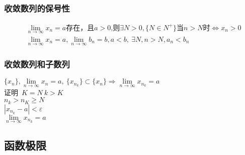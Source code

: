 \subsubsection{收敛数列的保号性}
\begin{align}
   &\mbox{$\lim\limits_{n \to\infty}x_n=a$存在，且$a>0$,则$\exists N>0,\{N\in N^+\}$当$n>N$时$\Leftrightarrow x_n>0$}\label{Serial_number_preservation_a}\\
    &\lim\limits_{n\to\infty}x_n=a,\lim\limits_{n\to\infty}b_n=b,a<b,\ \exists N,n>N,a_n<b_n \label{Serial_number_preservation_b}
\end{align}
\subsubsection{收敛数列和子数列
}
$\{x_n\},\lim\limits_{n\to\infty}x_n=a,\ \{x_{n_k}\}\subset\{x_n\}\Rightarrow \lim\limits_{n\to\infty}x_{n_k}=a$
\\证明\ $K=N\ k>K$\\
$n_k>n_K\geqslant N$\\
$\left|x_{n_k}-a\right|<\varepsilon$\\
$\lim\limits_{n\to\infty}x_{n_k}=a$

\subsection{函数极限}
